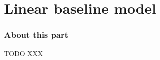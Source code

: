 \part{Linear baseline model}
\label{part:linear_baseline}


\section{About this part}
\label{section:LB_about_part}
TODO XXX

